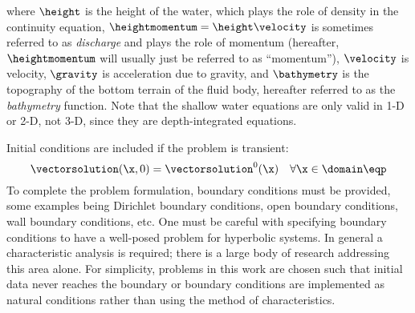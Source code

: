 where $\height$ is the height of the water, which plays the role of density
in the continuity equation, $\heightmomentum=\height\velocity$ is sometimes
referred to as \emph{discharge} and plays the role of momentum (hereafter,
$\heightmomentum$ will usually just be referred to as ``momentum''),
$\velocity$ is velocity, $\gravity$
is acceleration due to gravity, and $\bathymetry$ is the topography of the
bottom terrain of the fluid body, hereafter referred to as the \emph{bathymetry}
function.
Note that the shallow water equations are only valid in 1-D or 2-D, not 3-D,
since they are depth-integrated equations.

Initial conditions are included if the problem is transient:
\begin{equation}
   \vectorsolution(\x,0) = \vectorsolution^0(\x)
   \quad \forall \x\in\domain \eqp
\end{equation}
To complete the problem formulation, boundary
conditions must be provided, some examples being
Dirichlet boundary conditions, open boundary conditions,
wall boundary conditions,
etc. One must be careful with specifying boundary conditions to have
a well-posed problem for hyperbolic systems.
In general a characteristic analysis is required; there is a large body of research
addressing this area alone. For simplicity, problems in this work are
chosen such that initial data never reaches the boundary
or boundary conditions are implemented as natural conditions
rather than using the method of characteristics.

